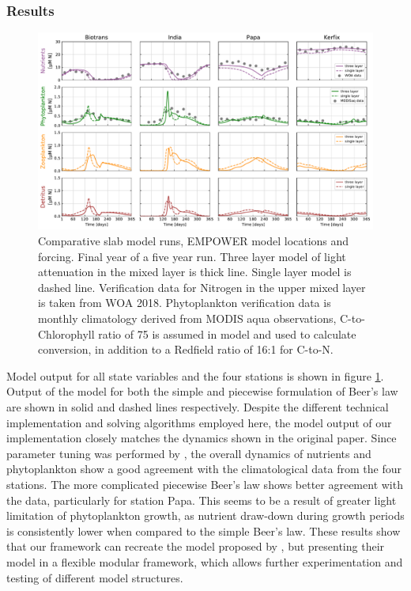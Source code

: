 \documentclass[journal abbreviation, manuscript]{copernicus}
\begin{document}
\subsubsection{Results}
\begin{figure}[t]
\includegraphics[width=15cm]{Figures/firstdraft_plots/02_EMPOWER_lightcomp.pdf}
\caption{Comparative slab model runs, EMPOWER model locations and forcing. Final year of a five year run. Three layer model of light attenuation in the mixed layer is thick line. Single layer model is dashed line. Verification data for Nitrogen in the upper mixed layer is taken from WOA 2018. Phytoplankton verification data is monthly climatology derived from MODIS aqua observations, C-to-Chlorophyll ratio of 75 is assumed in model and used to calculate conversion, in addition to a Redfield ratio of 16:1 for C-to-N.}
\label{Figure:ResultsEMPOWER}
\end{figure}

Model output for all state variables and the four stations is shown in figure \ref{Figure:ResultsEMPOWER}. Output of the model for both the simple and piecewise formulation of Beer's law are shown in solid and dashed lines respectively. 
Despite the different technical implementation and solving algorithms employed here, the model output of our implementation closely matches the dynamics shown in the original paper. Since parameter tuning was performed by \citet{Anderson2015c}, the overall dynamics of nutrients and phytoplankton show a good agreement with the climatological data from the four stations. The more complicated piecewise Beer's law shows better agreement with the data, particularly for station Papa. This seems to be a result of greater light limitation of phytoplankton growth, as nutrient draw-down during growth periods is consistently lower when compared to the simple Beer's law. These results show that our framework can recreate the model proposed by \citet{Anderson2015c}, but presenting their model in a flexible modular framework, which allows further experimentation and testing of different model structures.
\end{document}
